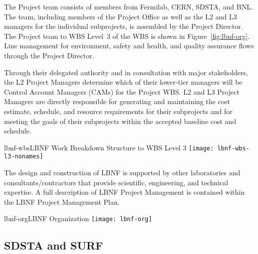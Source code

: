 The Project team consists of members from Fermilab, CERN, SDSTA, and BNL.  The team, including members of the Project Office as well as the L2 and L3 managers for the individual subprojects, is assembled by the Project Director. The Project team to WBS Level~3 of the WBS is shown in Figure~\ref{fig:lbnf-org}. 
Line management for environment, safety and health, and quality assurance flows through the Project Director. 


Through their delegated authority and in consultation with major stakeholders, the L2 Project Managers determine which of their lower-tier managers will be Control Account Managers (CAMs) for the Project WBS. L2 and L3 Project Managers are directly responsible for generating and maintaining the cost estimate, schedule, and resource requirements for their subprojects and for meeting the goals of their subprojects within the accepted baseline cost and schedule. 

\begin{cdrfigure}{lbnf-wbs}{LBNF Work Breakdown Structure to WBS Level 3}
  \texttt{[image: lbnf-wbs-l3-nonames]}
\end{cdrfigure}

The design and construction of LBNF is supported by other laboratories and consultants/contractors that provide scientific, engineering, and technical expertise. A full description of LBNF Project Management is contained within the LBNF Project Management Plan. \fixme{[ref]}

\begin{cdrfigure}{lbnf-org}{LBNF Organization}
  \texttt{[image: lbnf-org]}
\end{cdrfigure}




\subsection{SDSTA and SURF}

